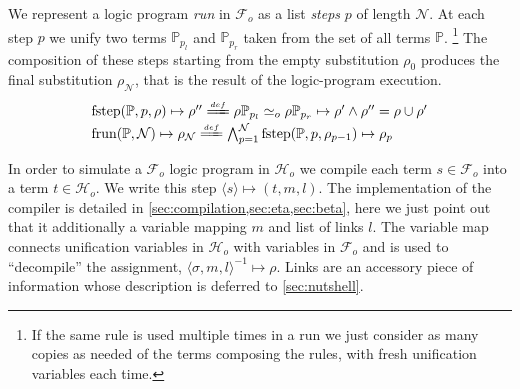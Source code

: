 \documentclass[sigconf,natbib=false,review]{acmart}
\newcommand{\UnifRel}{\ensuremath{\simeq}}
\newcommand{\Uo}{\ensuremath{\UnifRel_o}\xspace}
\newcommand{\Ue}{\ensuremath{\UnifRel_\lambda}\xspace}
\newcommand{\Fo}{\ensuremath{\mathcal{F}_{\!o}\xspace}} %
\newcommand{\Ho}{\ensuremath{\mathcal{H}_o}\xspace}
\newcommand{\foUnifPb}{\ensuremath{\mathbb{P}}\xspace}
\begin{document}
We represent a logic program \emph{run} in \Fo{} as
a list \emph{steps} $p$ of length $\mathcal{N}$.
At each step $p$ we unify two terms $\foUnifPb_{p_l}$ and
$\foUnifPb_{p_r}$ taken from the set of all terms \foUnifPb.
\footnote{If the same rule is used multiple times in a run we
just consider as many copies as needed of the terms composing the
rules, with fresh unification variables each time.}
The composition of these steps starting from the
empty substitution $\rho_0$ produces the final
substitution $\rho_\mathcal{N}$, that is the result of the
logic-program execution.
%
\newcommand{\C}[4]{\ensuremath{\langle #1 \rangle}\mapsto(#2,#3,#4)}
\newcommand{\D}[4]{\ensuremath{\langle #1,#2,#3 \rangle^{-1}\mapsto #4}}
\newcommand{\progress}{\ensuremath{\mathrm{progress}}\xspace}
\newcommand{\fstep}{\ensuremath{\mathrm{fstep}}\xspace}
\newcommand{\hstep}{\ensuremath{\mathrm{hstep}}\xspace}
\newcommand{\frun}{\ensuremath{\mathrm{frun}}\xspace}
\newcommand{\hrun}{\ensuremath{\mathrm{hrun}}\xspace}
\newcommand{\stepF}[4]{\ensuremath{\fstep(#1,#2,#3) \mapsto #4}}
\newcommand{\stepFD}[5]{%
\ensuremath{#3 #1_{#2_l} \Uo #3 #1_{#2_r} \mapsto #4 \land #5 = #3 \cup #4}}
\newcommand{\stepH}[6]{\ensuremath{\hstep(#1,#2,#3,#4) \mapsto (#5, #6)}}
\newcommand{\stepHD}[6]{\ensuremath{%
#3 #1_{#2_l} \Ue #3 #1_{#2_r} \mapsto #4 \land \progress(#6,#3 \cup #4) \mapsto (#6',#5)}}
\newcommand{\runF}[3]{\ensuremath{\frun(#1,#2) \mapsto #3_{#2}}}
\newcommand{\runFD}[2]{\ensuremath{%
\bigwedge_{p = 1}^{#2} \stepF{#1}{p}{\rho_{p-1}}{\rho_{p}}}}
\newcommand{\runH}[3]{\ensuremath{\hrun(#1,#2) \mapsto #3_{#2}}}
\newcommand{\runHD}[3]{\ensuremath{%
\bigwedge_{p = 1}^{#2} \stepH{#1}{p}{\sigma_{p-1}}{#3_{p-1}}{\sigma_{p}}{#3_p}}}
\newcommand{\deff}{\ensuremath{\stackrel{{\scriptscriptstyle def}}{=\!=\!\!\!=}}}
%
$$
\begin{array}{l}
\stepF{\foUnifPb}{p}{\rho}{\rho''}
\deff
\stepFD{\foUnifPb}{p}{\rho}{\rho'}{\rho''}\vspace{2pt}\\
\runF{\foUnifPb}{\mathcal{N}}{\rho}
\deff
\runFD{\foUnifPb}{\mathcal{N}}
\end{array}
$$

\noindent 
In order to simulate a \Fo{} logic program in \Ho{} we compile
each term $s \in \Fo{}$ into a term $t \in \Ho{}$. We write this
step $\C{s}{t}{m}{l}$. The implementation of the compiler
is detailed in \cref{sec:compilation,sec:eta,sec:beta}, here we just point
out that it additionally a variable mapping $m$ and list of links $l$.
The variable map connects unification variables in \Ho with variables
in \Fo{} and is used to ``decompile'' the assignment,
$\D{\sigma}{m}{l}{\rho}$. Links are an accessory piece of information whose
description is deferred to \cref{sec:nutshell}.
\end{document}
